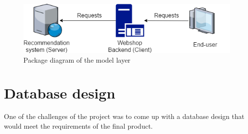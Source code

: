 \begin{figure}
	\centering
	\includegraphics[width=.8\linewidth]{Figures/ClientServer.png}
	\caption{Package diagram of the model layer}
	\label{fig:ClientServer}
\end{figure}

\section{Database design}
One of the challenges of the project was to come up with a database design that would meet the requirements of the final product.